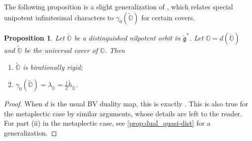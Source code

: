 \documentclass[11pt, a4paper]{amsart}
\newcommand{\orb}{\mathbb{O}}
\newcommand{\fg}{\mathfrak{g}}
\newcommand{\ckfg}{{\check{\fg}}}
\newcommand{\ckorb}{\check{\orb}}
\newtheorem{Prop}[Thm]{Proposition}
\theoremstyle{definition}
\numberwithin{equation}{section}
\begin{document}
The following proposition is a slight generalization of \cite[Proposition 9.1.1]{LMBM}, which relates special unipotent infinitesimal characters to $\gamma_0(\widetilde{\orb})$ for certain covers.

\begin{Prop}\label{prop:dual_dist}
	Let $\ckorb$ be a distinguished nilpotent orbit in $\ckfg^*$. Let $\orb = d(\ckorb)$ and $\widetilde{\orb}$ be the universal cover of $\orb$. Then 
	\begin{enumerate}[label=(\roman*), leftmargin=*]
		\item $\widetilde{\orb}$ is birationally rigid;
		\item $\gamma_0(\widetilde{\orb}) = \lambda_{\ckorb} = \frac{1}{2}\check{h}_{\ckorb}$.
	\end{enumerate}
\end{Prop}

\begin{proof}
	When $d$ is the usual BV duality map, this is exactly \cite[Proposition 9.1.1]{LMBM}. This is also true for the metaplectic case by similar arguments, whose details are left to the reader. For part (ii) in the metaplectic case, see \cref{prop:dual_quasi-dist} for a generalization.
\end{proof}
\end{document}

